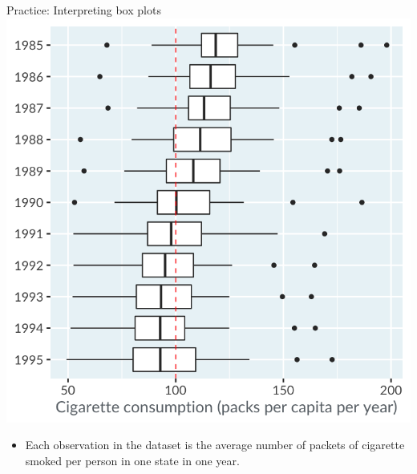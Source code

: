\documentclass[
  ignorenonframetext,
]{beamer}
\providecommand{\tightlist}{%
  \setlength{\itemsep}{0pt}\setlength{\parskip}{0pt}}
\begin{document}
\begin{frame}{Practice: Interpreting box plots}
\label{practice-interpreting-box-plots-1}
\includegraphics{../images/im29.png}

\begin{itemize}
\tightlist
\item
  Each observation in the dataset is the average number of packets of
  cigarette smoked per person in one state in one year.
\end{itemize}
\end{frame}
\end{document}
